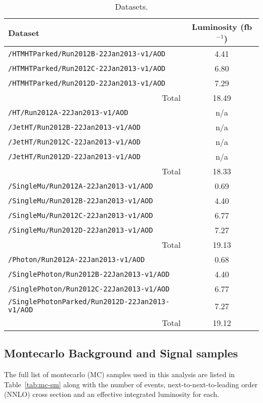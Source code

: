 \begin{table}[ht]
  \caption{Datasets.}
  \label{tab:datasets}
  \centering
  \scriptsize
  \begin{tabular}{ lc }
    \hline
    \hline
    Dataset & Luminosity (fb$^{-1}$) \\
    \hline
    \verb!/HTMHTParked/Run2012B-22Jan2013-v1/AOD! & 4.41 \\
    \verb!/HTMHTParked/Run2012C-22Jan2013-v1/AOD! & 6.80 \\
    \verb!/HTMHTParked/Run2012D-22Jan2013-v1/AOD! & 7.29 \\
    \multicolumn{1}{r}{Total} & 18.49 \\ [0.5ex]
    \verb!/HT/Run2012A-22Jan2013-v1/AOD! & n/a \\
    \verb!/JetHT/Run2012B-22Jan2013-v1/AOD! & n/a \\
    \verb!/JetHT/Run2012C-22Jan2013-v1/AOD! & n/a \\
    \verb!/JetHT/Run2012D-22Jan2013-v1/AOD! & n/a \\
    \multicolumn{1}{r}{Total} & 18.33 \\ [0.5ex]
    \verb!/SingleMu/Run2012A-22Jan2013-v1/AOD! & 0.69 \\
    \verb!/SingleMu/Run2012B-22Jan2013-v1/AOD! & 4.40 \\
    \verb!/SingleMu/Run2012C-22Jan2013-v1/AOD! & 6.77 \\
    \verb!/SingleMu/Run2012D-22Jan2013-v1/AOD! & 7.27 \\
    \multicolumn{1}{r}{Total} & 19.13 \\ [0.5ex] %
    \verb!/Photon/Run2012A-22Jan2013-v1/AOD! & 0.68 \\
    \verb!/SinglePhoton/Run2012B-22Jan2013-v1/AOD! & 4.40 \\
    \verb!/SinglePhoton/Run2012C-22Jan2013-v1/AOD! & 6.77 \\
    \verb!/SinglePhotonParked/Run2012D-22Jan2013-v1/AOD! & 7.27 \\
    \multicolumn{1}{r}{Total} & 19.12 \\ [0.5ex] %
    \hline
    \hline
  \end{tabular}
\end{table}

\subsection{Montecarlo Background and Signal samples}

The full list of montecarlo (MC) samples used in this analysis are listed in 
Table~\ref{tab:mc-sm} along with the number of events, next-to-next-to-leading 
order (NNLO) cross section and an effective integrated luminosity for each.

